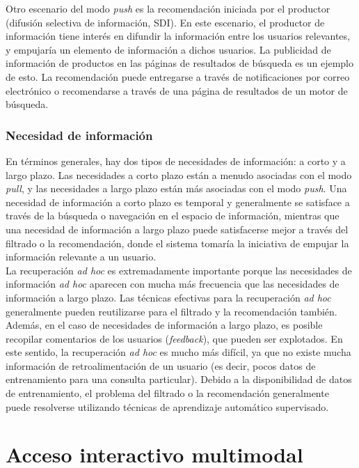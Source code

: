 Otro escenario del modo \textit{push} es la recomendación iniciada por el productor (difusión selectiva de información, SDI). En este escenario, el productor de información tiene interés en difundir la información entre los usuarios relevantes, y empujaría un elemento de información a dichos usuarios. La publicidad de información de productos en las páginas de resultados de búsqueda es un ejemplo de esto. La recomendación puede entregarse a través de notificaciones por correo electrónico o recomendarse a través de una página de resultados de un motor de búsqueda. 

\subsubsection{Necesidad de información}

En términos generales, hay dos tipos de necesidades de información: a corto y a largo plazo. Las necesidades a corto plazo están a menudo asociadas con el modo \textit{pull}, y las necesidades a largo plazo están más asociadas con el modo \textit{push}. Una necesidad de información a corto plazo es temporal y generalmente se satisface a través de la búsqueda o navegación en el espacio de información, mientras que una necesidad de información a largo plazo puede satisfacerse mejor a través del filtrado o la recomendación, donde el sistema tomaría la iniciativa de empujar la información relevante a un usuario. \\

La recuperación \textit{ad hoc} es extremadamente importante porque las necesidades de información \textit{ad hoc} aparecen con mucha más frecuencia que las necesidades de información a largo plazo. Las técnicas efectivas para la recuperación \textit{ad hoc} generalmente pueden reutilizarse para el filtrado y la recomendación también. Además, en el caso de necesidades de información a largo plazo, es posible recopilar comentarios de los usuarios (\textit{feedback}), que pueden ser explotados. En este sentido, la recuperación \textit{ad hoc} es mucho más difícil, ya que no existe mucha información de retroalimentación de un usuario (es decir, pocos datos de entrenamiento para una consulta particular). Debido a la disponibilidad de datos de entrenamiento, el problema del filtrado o la recomendación generalmente puede resolverse utilizando técnicas de aprendizaje automático supervisado.

\section{Acceso interactivo multimodal}

